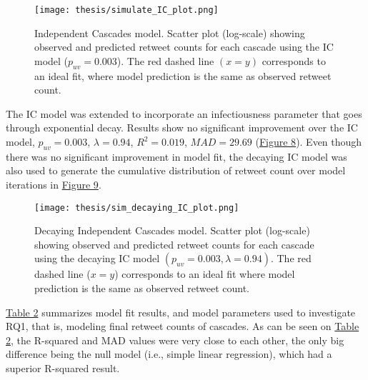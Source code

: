 \documentclass[11pt,a4paper]{article}
\begin{document}
    \begin{figure}[H]
        \hypertarget{fig:IC}{}
        \centering
        \texttt{[image: thesis/simulate\_IC\_plot.png]}\\
        \caption{Independent Cascades model. Scatter plot (log-scale) showing observed and predicted retweet counts for each cascade using the IC model ($p_{uv} = 0.003$). The red dashed line $(x=y)$ corresponds to an ideal fit, where model prediction is the same as observed retweet count.}    
        \label{fig:enter-label}
    \end{figure}

    The IC model was extended to incorporate an infectiousness parameter that goes through exponential decay. Results show no significant improvement over the IC model, $p_{uv} = 0.003$, $\lambda = 0.94$, $R^2 = 0.019$, $MAD = 29.69$ (\hyperlink{fig:dec-IC}{Figure 8}). Even though there was no significant improvement in model fit, the decaying IC model was also used to generate the cumulative distribution of retweet count over model iterations in \hyperlink{fig:ecdf-vs-iter}{Figure 9}.
    
    \begin{figure}[H]
        \hypertarget{fig:dec-IC}{}
        \centering
        \texttt{[image: thesis/sim\_decaying\_IC\_plot.png]}\\
        \caption{Decaying Independent Cascades model. Scatter plot (log-scale) showing observed and predicted retweet counts for each cascade using the decaying IC model $(p_{uv} = 0.003, \lambda = 0.94)$. The red dashed line ($x=y$) corresponds to an ideal fit where model prediction is the same as observed retweet count.}    
        \label{fig:enter-label}
    \end{figure}

    \hyperlink{tab:comp}{Table 2} summarizes model fit results, and model parameters used to investigate RQ1, that is, modeling final retweet counts of cascades. As can be seen on \hyperlink{tab:comp}{Table 2}, the R-squared and MAD values were very close to each other, the only big difference being the null model (i.e., simple linear regression), which had a superior R-squared result.
    
\end{document}
